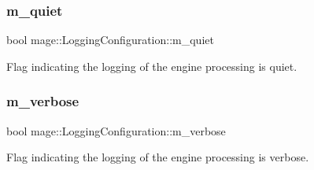 \subsubsection{\texorpdfstring{m\+\_\+quiet}{m\_quiet}}
{\footnotesize\ttfamily bool mage\+::\+Logging\+Configuration\+::m\+\_\+quiet\hspace{0.3cm}{\ttfamily [private]}}

Flag indicating the logging of the engine processing is quiet. \hypertarget{structmage_1_1_logging_configuration_a60f052c2bb702d8153188e93f00427ac}{}\label{structmage_1_1_logging_configuration_a60f052c2bb702d8153188e93f00427ac} 
\subsubsection{\texorpdfstring{m\+\_\+verbose}{m\_verbose}}
{\footnotesize\ttfamily bool mage\+::\+Logging\+Configuration\+::m\+\_\+verbose\hspace{0.3cm}{\ttfamily [private]}}

Flag indicating the logging of the engine processing is verbose. 